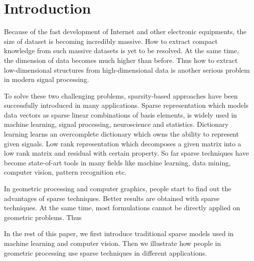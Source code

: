 \section{Introduction}
\label{sec:Introduction}
Because of the fast development of Internet and other electronic equipments, the size of dataset is becoming  incredibly massive.
How to extract compact knowledge from such massive datasets is yet to be resolved.
At the same time, the dimension of data becomes much higher than before.
Thus how to extract low-dimensional structures from high-dimensional data is another serious problem in modern signal processing.

To solve these two challenging problems, sparsity-based approaches have been successfully introduced in many applications.
Sparse representation which models data vectors as sparse linear combinations of basis elements, is widely used in machine learning, signal processing, neuroscience and statistics.
Dictionary learning learns an overcomplete dictionary which owns the ability to represent given signals.
Low rank representation which decomposes a given matrix into a low rank matrix and residual with certain property.
So far sparse techniques have become state-of-art tools in many fields like machine learning, data mining, computer vision, pattern recognition etc.

In geometric processing and computer graphics, people start to find out the advantages of sparse techniques.
Better results are obtained with sparse techniques.
At the same time, most formulations cannot be directly applied on geometric problems.
Thus 


In the rest of this paper, we first introduce traditional sparse models used in machine learning and computer vision.
Then we illustrate how people in geometric processing use sparse techniques in different applications.